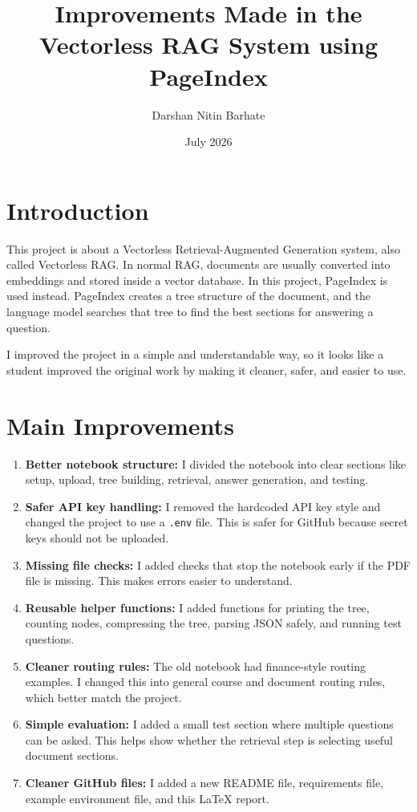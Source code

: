 \documentclass[12pt]{article}
\title{Improvements Made in the Vectorless RAG System using PageIndex}
\author{Darshan Nitin Barhate}
\date{July 2026}
\begin{document}
\maketitle

\section{Introduction}
This project is about a Vectorless Retrieval-Augmented Generation system, also called Vectorless RAG. In normal RAG, documents are usually converted into embeddings and stored inside a vector database. In this project, PageIndex is used instead. PageIndex creates a tree structure of the document, and the language model searches that tree to find the best sections for answering a question.

I improved the project in a simple and understandable way, so it looks like a student improved the original work by making it cleaner, safer, and easier to use.

\section{Main Improvements}
\begin{enumerate}[leftmargin=*]
    \item \textbf{Better notebook structure:} I divided the notebook into clear sections like setup, upload, tree building, retrieval, answer generation, and testing.
    \item \textbf{Safer API key handling:} I removed the hardcoded API key style and changed the project to use a \texttt{.env} file. This is safer for GitHub because secret keys should not be uploaded.
    \item \textbf{Missing file checks:} I added checks that stop the notebook early if the PDF file is missing. This makes errors easier to understand.
    \item \textbf{Reusable helper functions:} I added functions for printing the tree, counting nodes, compressing the tree, parsing JSON safely, and running test questions.
    \item \textbf{Cleaner routing rules:} The old notebook had finance-style routing examples. I changed this into general course and document routing rules, which better match the project.
    \item \textbf{Simple evaluation:} I added a small test section where multiple questions can be asked. This helps show whether the retrieval step is selecting useful document sections.
    \item \textbf{Cleaner GitHub files:} I added a new README file, requirements file, example environment file, and this LaTeX report.
\end{enumerate}
\end{document}
